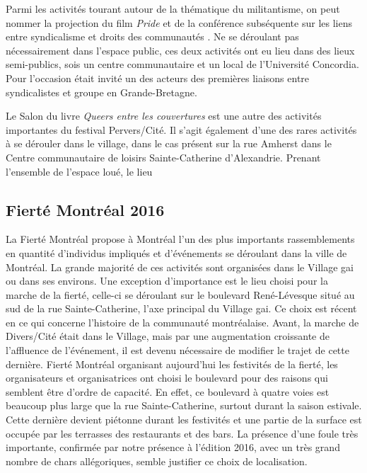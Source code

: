 Parmi les activités tourant autour de la thématique du militantisme, on peut nommer la projection du film \emph{Pride} et de la conférence subséquente sur les liens entre syndicalisme et droits des communautés \lgbt{}.
Ne se déroulant pas nécessairement dans l'espace public, ces deux activités ont eu lieu dans des lieux semi-publics, sois un centre communautaire et un local de l'Université Concordia.
Pour l'occasion était invité un des acteurs  des premières liaisons entre syndicalistes et groupe \lgbt{} en Grande-Bretagne.

Le Salon du livre \emph{Queers entre les couvertures} est une autre des activités importantes du festival Pervers/Cité.
Il s'agit également d'une des rares activités à se dérouler dans le village, dans le cas présent sur la rue Amherst dans le Centre communautaire de loisirs Sainte-Catherine d'Alexandrie.
Prenant l'ensemble de l'espace loué, le lieu
\subsection{Fierté Montréal 2016}
\label{subsec:fiertemontreal2016}
La Fierté Montréal propose à Montréal l'un des plus importants rassemblements \lgbt en quantité d'individus impliqués et d'événements se déroulant dans la ville de Montréal.
La grande majorité de ces activités sont organisées dans le Village gai ou dans ses environs.
Une exception d'importance est le lieu choisi pour la marche de la fierté, celle-ci se déroulant sur le boulevard René-Lévesque situé au sud de la rue Sainte-Catherine, l'axe principal du Village gai.
Ce choix est récent en ce qui concerne l'histoire de la communauté \lgbt montréalaise.
Avant, la marche de Divers/Cité était dans le Village, mais par une augmentation croissante de l'affluence de l'événement, il est devenu nécessaire de modifier le trajet de cette dernière.
Fierté Montréal organisant aujourd'hui les festivités de la fierté, les organisateurs et organisatrices ont choisi le boulevard pour des raisons qui semblent être d'ordre de capacité.
En effet, ce boulevard à quatre voies est beaucoup plus large que la rue Sainte-Catherine, surtout durant la saison estivale.
Cette dernière devient piétonne durant les festivités et une partie de la surface est occupée par les terrasses des restaurants et des bars.
La présence d'une foule très importante, confirmée par notre présence à l'édition 2016, avec un très grand nombre de chars allégoriques, semble justifier ce choix de localisation.

